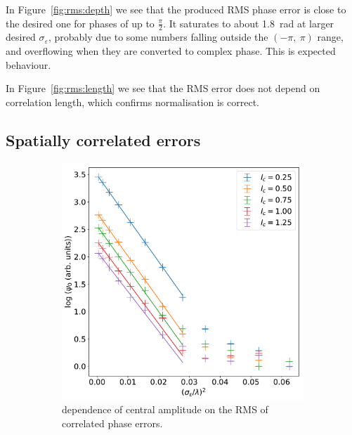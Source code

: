 \documentclass{article}
\newcommand{\eps}{\varepsilon}
\begin{document}
In Figure~\ref{fig:rms:depth} we see that the produced RMS phase error is close to the desired one for phases of up to $\frac{\pi}{2}$. It saturates to about \SI{1.8}{\radian} at larger desired $\sigma_\eps$, probably due to some numbers falling outside the $(-\pi,\ \pi)$ range, and overflowing when they are converted to complex phase. This is expected behaviour.

In Figure~\ref{fig:rms:length} we see that the RMS error does not depend on correlation length, which confirms normalisation is correct.

\subsection{Spatially correlated errors}\label{sec:res:corr}
\begin{figure}
    \centering
    \begin{subfigure}{0.47\textwidth}
        \centering
        \includegraphics[width=\textwidth]{pictures/corr/amp.pdf}
        \caption{dependence of central amplitude on the RMS of correlated phase errors.}
    \end{subfigure}%
    \hfill
    \begin{subfigure}{0.47\textwidth}
        \centering

\end{subfigure}
\end{figure}
\end{document}
